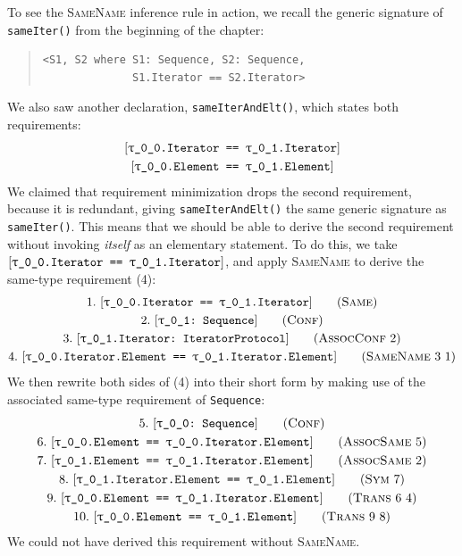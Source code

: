 \documentclass[../generics]{subfiles}
\begin{document}
\begin{example}\label{same name rule example}
To see the \textsc{SameName} inference rule in action, we recall the generic signature of \texttt{sameIter()} from the beginning of the chapter:
\begin{quote}
\begin{verbatim}
<S1, S2 where S1: Sequence, S2: Sequence,
              S1.Iterator == S2.Iterator>
\end{verbatim}
\end{quote}
We also saw another declaration, \texttt{sameIterAndElt()}, which states both requirements:
\begin{gather*}
\SameReq{\rT.Iterator}{\rU.Iterator}\\
\SameReq{\rT.Element}{\rU.Element}
\end{gather*}
We claimed that requirement minimization drops the second requirement, because it is redundant, giving \texttt{sameIterAndElt()} the same generic signature as \texttt{sameIter()}. This means that we should be able to derive the second requirement without invoking \emph{itself} as an elementary statement. To do this, we take $\SameReq{\rT.Iterator}{\rU.Iterator}$, and apply \textsc{SameName} to derive the same-type requirement (4):
\begin{gather*}
\SameStep{\rT.Iterator}{\rU.Iterator}{1}\\
\ConfStep{\rU}{Sequence}{2}\\
\AssocConfStep{2}{\rU.Iterator}{IteratorProtocol}{3}\\
\SameNameStep{3}{1}{\rT.Iterator.Element}{\rU.Iterator.Element}{4}
\end{gather*}
We then rewrite both sides of (4) into their short form by making use of the associated same-type requirement of \texttt{Sequence}:
\begin{gather*}
\ConfStep{\rT}{Sequence}{5}\\
\AssocSameStep{5}{\rT.Element}{\rT.Iterator.Element}{6}\\
\AssocSameStep{2}{\rU.Element}{\rU.Iterator.Element}{7}\\
\SymStep{7}{\rU.Iterator.Element}{\rU.Element}{8}\\
\TransStep{6}{4}{\rT.Element}{\rU.Iterator.Element}{9}\\
\TransStep{9}{8}{\rT.Element}{\rU.Element}{10}
\end{gather*}
We could not have derived this requirement without \textsc{SameName}.
\end{example}
\end{document}
